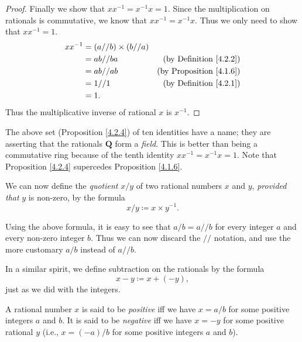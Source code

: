 \begin{proof}
    Finally we show that \(xx^{-1} = x^{-1}x = 1\).
    Since the multiplication on rationals is commutative, we know that \(xx^{-1} = x^{-1}x\).
    Thus we only need to show that \(xx^{-1} = 1\).
    \begin{align*}
        xx^{-1} & = (a // b) \times (b // a)                                       \\
                & = ab // ba                 & \text{(by Definition \ref{4.2.2})}  \\
                & = ab // ab                 & \text{(by Proposition \ref{4.1.6})} \\
                & = 1 // 1                   & \text{(by Definition \ref{4.2.1})}  \\
                & = 1.
    \end{align*}
    Thus the multiplicative inverse of rational \(x\) is \(x^{-1}\).
\end{proof}

\begin{remark}\label{4.2.5}
    The above set (Proposition \ref{4.2.4}) of ten identities have a name;
    they are asserting that the rationals \(\mathbf{Q}\) form a \emph{field}.
    This is better than being a commutative ring because of the tenth identity \(xx^{-1} = x^{-1}x = 1\).
    Note that Proposition \ref{4.2.4} supercedes Proposition \ref{4.1.6}.
\end{remark}

\begin{note}
    We can now define the \emph{quotient} \(x / y\) of two rational numbers \(x\) and \(y\), \emph{provided that} \(y\) is non-zero, by the formula
    \[
        x / y \coloneqq x \times y^{-1}.
    \]
\end{note}

\begin{note}
    Using the above formula, it is easy to see that \(a / b = a // b\) for every integer \(a\) and every non-zero integer \(b\).
    Thus we can now discard the \(//\) notation, and use the more customary \(a / b\) instead of \(a // b\).
\end{note}

\begin{note}
    In a similar spirit, we define subtraction on the rationals by the formula
    \[
        x - y \coloneqq x + (-y),
    \]
    just as we did with the integers.
\end{note}

\begin{definition}\label{4.2.6}
    A rational number \(x\) is said to be \emph{positive} iff we have \(x = a / b\) for some positive integers \(a\) and \(b\).
    It is said to be \emph{negative} iff we have \(x = -y\) for some positive rational \(y\)
    (i.e., \(x = (-a) / b\) for some positive integers \(a\) and \(b\)).
\end{definition}

